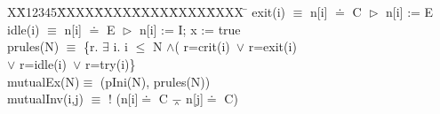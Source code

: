 \documentclass[conference]{IEEEtran}
\newlength{\fminilength}
\newenvironment{fmini}[1][\linewidth]
  {\setlength{\fminilength}{#1\fboxsep-2\fboxrule}%
   \vspace{2ex}\noindent\begin{lrbox}{\fminibox}\begin{minipage}{\fminilength}%
   \mbox{ }\hfill\vspace{-2.5ex}}%
  {\end{minipage}\end{lrbox}\vspace{1ex}\hspace{0ex}%
   \framebox{\usebox{\fminibox}}}
\newenvironment{specification}
{\noindent\scriptsize
\tt\begin{fmini}\begin{tabbing}X\=X12345\=XXXX\=XXXX\=XXXX\=XXXX\=XXXX
\=\+\kill} {\end{tabbing}\normalfont\end{fmini}}
\def \eqc {\doteq }
\def \andc {\barwedge }
\def \negc {!}
\begin{document}
{\begin{example}
\begin{specification}
%
   exit(i) $\equiv$ n[i] $\eqc$ C $\vartriangleright$ n[i] := E \\


   idle(i) $\equiv$  n[i] $\eqc$ E $\vartriangleright$ n[i] := I;  x := true
  \\%
   prules(N) $\equiv$ \{r. $\exists$ i. i $\le$ N $\wedge$( r=crit(i)~$\vee$ r=exit(i) \\
    $\vee$ r=idle(i)~$\vee$ r=try(i)\}\\

mutualEx(N)$\equiv$ (pIni(N), prules(N))\\

mutualInv(i,j) $\equiv$
  $\negc$ (n[i]$\eqc$ C $\andc$ n[j]$\eqc$ C)\\



\end{specification}
\end{example}




}
\end{document}
